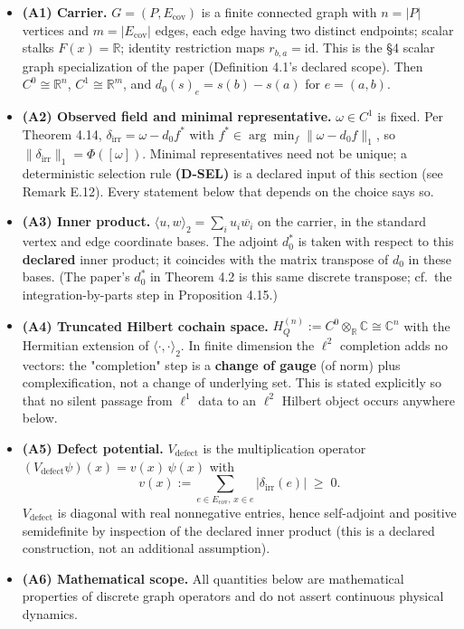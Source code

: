 \documentclass[
]{article}
\begin{document}
\begin{itemize}
\item
  \textbf{(A1) Carrier.} \(G = (P, E_{\mathrm{cov}})\) is a finite connected graph with \(n = |P|\) vertices and \(m = |E_{\mathrm{cov}}|\) edges, each edge having two distinct endpoints; scalar stalks \(F(x) = \mathbb{R}\); identity restriction maps \(r_{b,a} = \mathrm{id}\). This is the §4 scalar graph specialization of the paper (Definition 4.1's declared scope). Then \(C^0 \cong \mathbb{R}^n\), \(C^1 \cong \mathbb{R}^m\), and \(d_0(s)_e = s(b) - s(a)\) for \(e = (a,b)\).
\item
  \textbf{(A2) Observed field and minimal representative.} \(\omega \in C^1\) is fixed. Per Theorem 4.14, \(\delta_{\mathrm{irr}} = \omega - d_0 f^*\) with \(f^* \in \arg\min_f \|\omega - d_0 f\|_1\), so \(\|\delta_{\mathrm{irr}}\|_1 = \Phi([\omega])\). Minimal representatives need not be unique; a deterministic selection rule \textbf{(D-SEL)} is a declared input of this section (see Remark E.12). Every statement below that depends on the choice says so.
\item
  \textbf{(A3) Inner product.} \(\langle u, w \rangle_2 = \sum_i u_i \overline{w_i}\) on the carrier, in the standard vertex and edge coordinate bases. The adjoint \(d_0^*\) is taken with respect to this \textbf{declared} inner product; it coincides with the matrix transpose of \(d_0\) in these bases. (The paper's \(d_0^*\) in Theorem 4.2 is this same discrete transpose; cf.~the integration-by-parts step in Proposition 4.15.)
\item
  \textbf{(A4) Truncated Hilbert cochain space.} \(H_Q^{(n)} := C^0 \otimes_{\mathbb{R}} \mathbb{C} \cong \mathbb{C}^n\) with the Hermitian extension of \(\langle\cdot,\cdot\rangle_2\). In finite dimension the \(\ell^2\) completion adds no vectors: the "completion" step is a \textbf{change of gauge} (of norm) plus complexification, not a change of underlying set. This is stated explicitly so that no silent passage from \(\ell^1\) data to an \(\ell^2\) Hilbert object occurs anywhere below.
\item
  \textbf{(A5) Defect potential.} \(V_{\mathrm{defect}}\) is the multiplication operator \((V_{\mathrm{defect}}\psi)(x) = v(x)\,\psi(x)\) with
  \[v(x) := \sum_{e \in E_{\mathrm{cov}},\, x \in e} |\delta_{\mathrm{irr}}(e)| \;\ge\; 0 .\]
  \(V_{\mathrm{defect}}\) is diagonal with real nonnegative entries, hence self-adjoint and positive semidefinite by inspection of the declared inner product (this is a declared construction, not an additional assumption).
\item
  \textbf{(A6) Mathematical scope.} All quantities below are mathematical properties of discrete graph operators and do not assert continuous physical dynamics.
\end{itemize}
\end{document}
